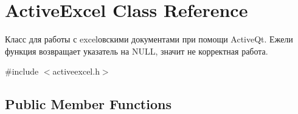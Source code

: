\hypertarget{class_active_excel}{}\section{Active\+Excel Class Reference}
\label{class_active_excel}


Класс для работы с excel\textquotesingle{}овскими документами при помощи Active\+Qt. Ежели функция возвращает указатель на N\+U\+LL, значит не корректная работа.  




{\ttfamily \#include $<$activeexcel.\+h$>$}

\subsection*{Public Member Functions}
